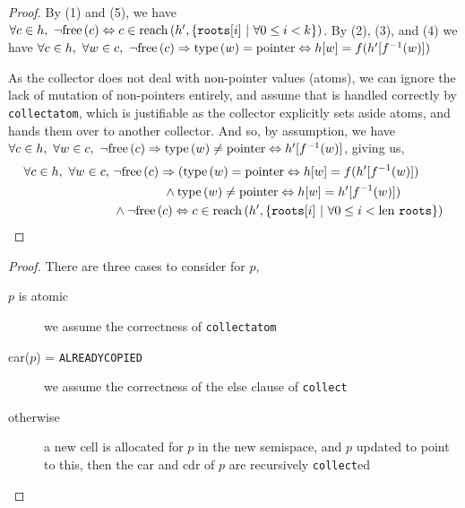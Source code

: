 \begin{proof}
  By (1) and (5), we have $\forall c \in h,\ \lnot\mathrm{free}\left(c\right) \Leftrightarrow c \in
  \mathrm{reach}\left(h', \{\mathtt{roots}[i]~|~\forall 0 \leq i < k\}\right)$. By (2),
  (3), and (4) we have $\forall c \in h,\ \forall w \in c,\ \lnot\mathrm{free}\left(c\right)
  \Rightarrow \mathrm{type}\left(w\right) = \mathrm{pointer} \Leftrightarrow h[w] =
  f(h'[f^{-1}(w)])$

  As the collector does not deal with non-pointer values (atoms), we
  can ignore the lack of mutation of non-pointers entirely, and assume
  that is handled correctly by \texttt{collectatom}, which is
  justifiable as the collector explicitly sets aside atoms, and hands
  them over to another collector. And so, by assumption, we have
  $\forall c \in h,\ \forall w \in c,\ \lnot\mathrm{free}\left(c\right) \Rightarrow
  \mathrm{type}\left(w\right) \neq \mathrm{pointer} \Leftrightarrow h'[f^{-1}(w)]$, giving
  us,
  \begin{align*}
    \forall c \in h,\ \forall w \in c,\ &\lnot\mathrm{free}\left(c\right) \Rightarrow
    (\mathrm{type}\left(w\right) = \mathrm{pointer} \Leftrightarrow h[w] = f(h'[f^{-1}(w)])\\
    &\quad\quad\quad\quad \land \mathrm{type}\left(w\right) \neq \mathrm{pointer}
    \Leftrightarrow h[w] = h'[f^{-1}(w)])\\
    &\land \lnot\mathrm{free}\left(c\right) \Leftrightarrow c \in \mathrm{reach}\left(h', \{\mathtt{roots}[i]~|~\forall
      0 \leq i < \mathrm{len}~\mathtt{roots}\}\right)
  \end{align*}
\end{proof}

\begin{lemma}
  \label{lem:c-example-reach}
\end{lemma}

\begin{proof}
  There are three cases to consider for $p$,

  \begin{description}
  \item[$p$ is atomic] we assume the correctness of
    \texttt{collectatom}

  \item[car($p$) = \texttt{ALREADYCOPIED}] we assume the correctness
    of the else clause of \texttt{collect}

  \item[otherwise] a new cell is allocated for $p$ in the new
    semispace, and $p$ updated to point to this, then the car and cdr
    of $p$ are recursively \texttt{collect}ed
  \end{description}
\end{proof}

